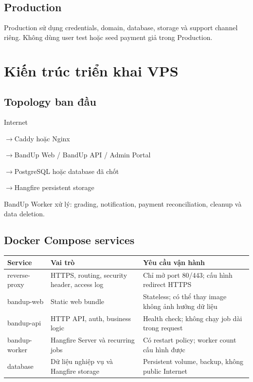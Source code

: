 \documentclass[11pt,a4paper]{article}
\newcommand{\arrow}{\ensuremath{\rightarrow}}
\begin{document}
\subsection{Production}

Production sử dụng credentials, domain, database, storage và support channel riêng. Không dùng user test hoặc seed payment giả trong Production.

\section{Kiến trúc triển khai VPS}

\subsection{Topology ban đầu}

\begin{flowbox}
Internet

\arrow Caddy hoặc Nginx

\arrow BandUp Web / BandUp API / Admin Portal

\arrow PostgreSQL hoặc database đã chốt

\arrow Hangfire persistent storage

BandUp Worker xử lý: grading, notification, payment reconciliation, cleanup và data deletion.
\end{flowbox}

\subsection{Docker Compose services}

\begin{longtable}{L{0.25\textwidth}L{0.30\textwidth}L{0.37\textwidth}}
\toprule
\textbf{Service} & \textbf{Vai trò} & \textbf{Yêu cầu vận hành} \\
\midrule
reverse-proxy & HTTPS, routing, security header, access log & Chỉ mở port 80/443; cấu hình redirect HTTPS \\
bandup-web & Static web bundle & Stateless; có thể thay image không ảnh hưởng dữ liệu \\
bandup-api & HTTP API, auth, business logic & Health check; không chạy job dài trong request \\
bandup-worker & Hangfire Server và recurring jobs & Có restart policy; worker count cấu hình được \\
database & Dữ liệu nghiệp vụ và Hangfire storage & Persistent volume, backup, không public Internet \\
\bottomrule
\end{longtable}
\end{document}
